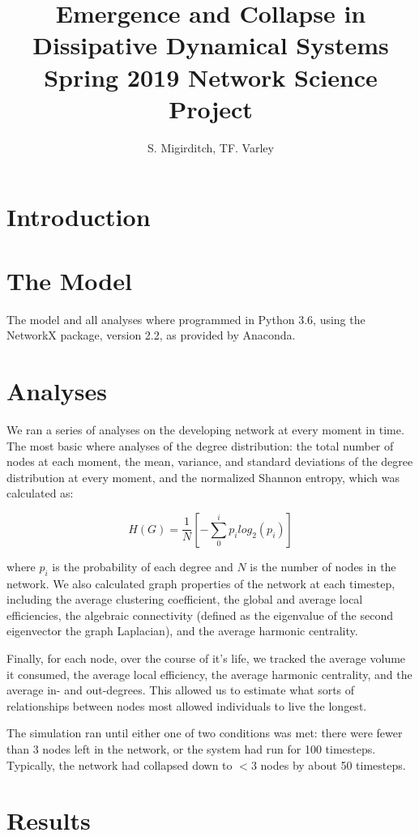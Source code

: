 \documentclass{paper}
\title{Emergence and Collapse in Dissipative Dynamical Systems \\ \textnormal{Spring 2019 Network Science Project}}
\author{S. Migirditch, TF. Varley}
\begin{document}
	\maketitle
	
	\section{Introduction}
	
	\section{The Model}
	
	The model and all analyses where programmed in Python 3.6, using the NetworkX package, version 2.2, as provided by Anaconda. 
	\section{Analyses}
	
	We ran a series of analyses on the developing network at every moment in time. The most basic where analyses of the degree distribution: the total number of nodes at each moment, the mean, variance, and standard deviations of the degree distribution at every moment, and the normalized Shannon entropy, which was calculated as:
	
	\[ H(G) = \frac{1}{N}[-\sum_{0}^{i} p_{i}log_{2}(p_{i})] \] 
	
	where $p_{i}$ is the probability of each degree and $N$ is the number of nodes in the network. We also calculated graph properties of the network at each timestep, including the average clustering coefficient, the global and average local efficiencies, the algebraic connectivity (defined as the eigenvalue of the second eigenvector the graph Laplacian), and the average harmonic centrality.
	
	Finally, for each node, over the course of it's life, we tracked the average volume it consumed, the average local efficiency, the average harmonic centrality, and the average in- and out-degrees. This allowed us to estimate what sorts of relationships between nodes most allowed individuals to live the longest. 
	
	The simulation ran until either one of two conditions was met: there were fewer than 3 nodes left in the network, or the system had run for 100 timesteps. Typically, the network had collapsed down to $<$3 nodes by about 50 timesteps. 
	
	\section{Results}
	
\end{document}
